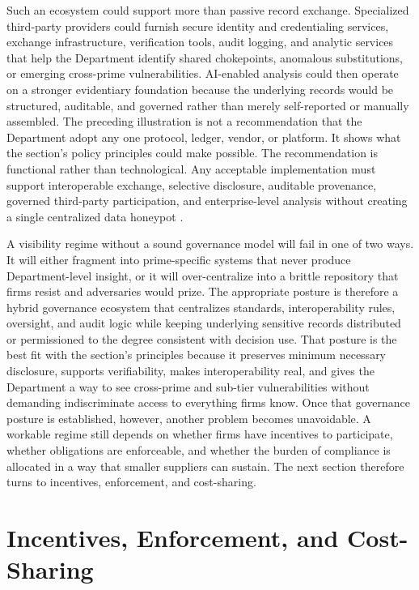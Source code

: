 Such an ecosystem could support more than passive record exchange. Specialized third-party providers could furnish secure identity and credentialing services, exchange infrastructure, verification tools, audit logging, and analytic services that help the Department identify shared chokepoints, anomalous substitutions, or emerging cross-prime vulnerabilities. AI-enabled analysis could then operate on a stronger evidentiary foundation because the underlying records would be structured, auditable, and governed rather than merely self-reported or manually assembled. The preceding illustration is not a recommendation that the Department adopt any one protocol, ledger, vendor, or platform. It shows what the section's policy principles could make possible. The recommendation is functional rather than technological. Any acceptable implementation must support interoperable exchange, selective disclosure, auditable provenance, governed third-party participation, and enterprise-level analysis without creating a single centralized data honeypot \parencite{ch5_nist800161r1upd1,ch5_space_trustworthy_data_2025}.

A visibility regime without a sound governance model will fail in one of two ways. It will either fragment into prime-specific systems that never produce Department-level insight, or it will over-centralize into a brittle repository that firms resist and adversaries would prize. The appropriate posture is therefore a hybrid governance ecosystem that centralizes standards, interoperability rules, oversight, and audit logic while keeping underlying sensitive records distributed or permissioned to the degree consistent with decision use. That posture is the best fit with the section's principles because it preserves minimum necessary disclosure, supports verifiability, makes interoperability real, and gives the Department a way to see cross-prime and sub-tier vulnerabilities without demanding indiscriminate access to everything firms know. Once that governance posture is established, however, another problem becomes unavoidable. A workable regime still depends on whether firms have incentives to participate, whether obligations are enforceable, and whether the burden of compliance is allocated in a way that smaller suppliers can sustain. The next section therefore turns to incentives, enforcement, and cost-sharing.

\section{Incentives, Enforcement, and Cost-Sharing}
\label{sec:ch5_incentives_enforcement_cost_sharing}

